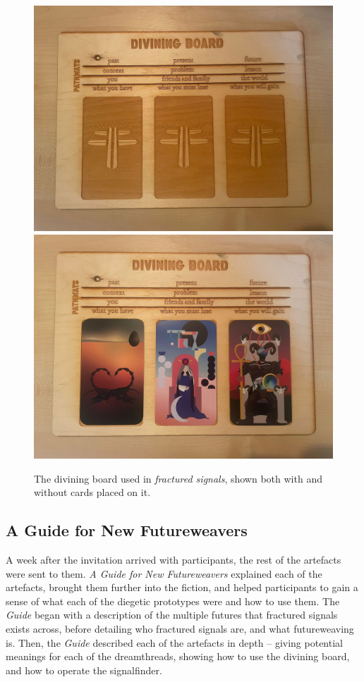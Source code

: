 \begin{figure}
    \centering
    \includegraphics[width=1\linewidth]{Images/8/divining-board.jpeg}
    \includegraphics[width=1\linewidth]{Images/8/divining-board-cards.jpeg}
    \caption{The divining board used in \textit{fractured signals}, shown both with and without cards placed on it.}
    \label{fig:divining-board}
\end{figure}

\subsection{A Guide for New Futureweavers}

A week after the invitation arrived with participants, the rest of the artefacts were sent to them. \textit{A Guide for New Futureweavers} explained each of the artefacts, brought them further into the fiction, and helped participants to gain a sense of what each of the diegetic prototypes were and how to use them. The \textit{Guide} began with a description of the multiple futures that fractured signals exists across, before detailing who fractured signals are, and what futureweaving is. Then, the \textit{Guide} described each of the artefacts in depth – giving potential meanings for each of the dreamthreads, showing how to use the divining board, and how to operate the signalfinder. 

